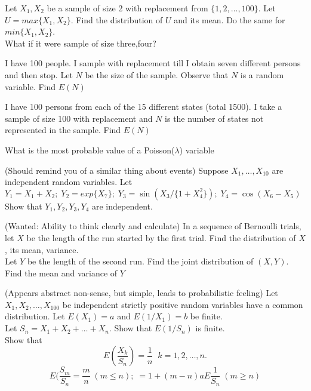 \documentclass[12pt]{article}
\newenvironment{question}[2][Question]{\begin{trivlist}
\item[\hskip \labelsep {\bfseries #1}\hskip \labelsep {\bfseries #2.}]}{\end{trivlist}}
\begin{document}
\begin{question}{41}
Let $X_1,X_2$ be a sample of size 2 with replacement from $\{1,2,\ldots,100\}$. Let $U = max\{X_1,X_2\}$. Find the distribution of $U$ and its mean. Do the same for $min\{X_1,X_2\}$.\\What if it were sample of size three,four?
\end{question}

\begin{question}{42}
I have 100 people. I sample with replacement till I obtain seven different persons and then stop. Let $N$ be the size of the sample. Observe that $N$ is a random variable. Find $E(N)$
\end{question}

\begin{question}{43}
I have 100 persons from each of the 15 different states (total 1500). I take a sample of size 100 with replacement and $N$ is the number of states not represented in the sample. Find $E(N)$
\end{question}

\begin{question}{44}
What is the most probable value of a Poisson($\lambda$) variable
\end{question}

\begin{question}{45}
(Should remind you of a similar thing about events) Suppose $X_1,\ldots,X_{10}$ are independent random variables. Let $Y_1=X_1+X_2;\; Y_2=exp\{X_7\};\; Y_3 = \sin(X_3/\{1 + X_4^2\});\; Y_4 = \cos(X_6-X_5)$\\ Show that $Y_1,Y_2,Y_3,Y_4$ are independent.
\end{question}

\begin{question}{46}
(Wanted: Ability to think clearly and calculate) In a sequence of Bernoulli trials, let $X$ be the length of the run started by the first trial. Find the distribution of $X$, its mean, variance.\\
Let $Y$ be the length of the second run. Find the joint distribution of $(X,Y)$. Find the mean and variance of $Y$
\end{question}

\begin{question}{47}
(Appears abstract non-sense, but simple, leads to probabilistic feeling) Let $X_1,X_2,\ldots,X_100$ be independent strictly positive random variables have a common distribution. Let $E(X_1) = a$ 	and $E(1/X_1) = b$ be finite.\\
Let $S_n = X_1 + X_2 + \ldots + X_n$. Show that $E(1/S_n)$ is finite.\\
Show that
\[
E(\frac{X_k}{S_n}) = \frac{1}{n}\;\; k = 1,2,\ldots,n.
\]
\[
E(\frac{S_m}{S_n} = \frac{m}{n}\; (m \leq n);\; = 1 + (m-n)aE\frac{1}{S_n}\; (m \geq n)
\]
\end{question}
\end{document}
